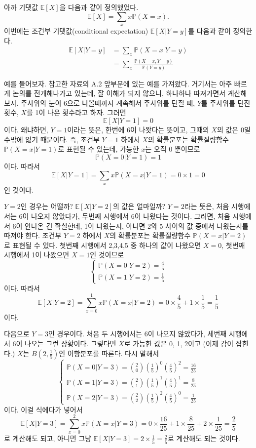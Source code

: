 \documentclass{article}
\begin{document}
아까 기댓값 \(\mathbb E[X]\)을 다음과 같이 정의했었다.
\[\mathbb E[X]=\sum_x x\mathbb P(X=x).\]
이번에는 조건부 기댓값(conditional expectation) \(\mathbb E[X|Y=y]\)를 다음과 같이 정의한다.
\begin{align*}
\mathbb E[X|Y=y]
&=\sum_x\mathbb P(X=x|Y=y)\\
&=\sum_x\frac{\mathbb P(X=x, Y=y)}{\mathbb P(Y=y)}
\end{align*}

예를 들어보자.
참고한 자료의 A.2 앞부분에 있는 예를 가져왔다.
거기서는  아주 빠르게 논의를 전개해나가고 있는데, 잘 이해가 되지 않으니, 하나하나 따져가면서 계산해보자.
주사위의 눈이 6으로 나올때까지 계속해서 주사위를 던질 때, \(Y\)를 주사위를 던진 횟수, \(X\)를 1이 나온 횟수라고 하자.
그러면
\[\mathbb E[X|Y=1]=0\]
이다.
왜냐하면, \(Y=1\)이라는 뜻은, 한번에 6이 나왓다는 뜻이고, 그때의 \(X\)의 값은 0일 수밖에 없기 때문이다.
즉, 조건부 \(Y=1\) 하에서 \(X\)의 확률분포는 확률질량함수 \(\mathbb P(X=x|Y=1)\)로 표현될 수 있는데, 가능한 \(x\)는 오직 0 뿐이므로
\[\mathbb P(X=0|Y=1)=1\]
이다.
따라서
\[\mathbb E[X|Y=1]=\sum_xx\mathbb P(X=x|Y=1)=0\times1=0\]
인 것이다.

\(Y=2\)인 경우는 어떨까?
\(\mathbb E[X|Y=2]\)의 값은 얼마일까?
\(Y=2\)라는 뜻은, 처음 시행에서는 6이 나오지 않았다가, 두번째 시행에서 6이 나왔다는 것이다.
그러면, 처음 시행에서 6이 안나온 건 확실한데, 1이 나왔는지, 아니면 2와 5 사이의 값 중에서 나왔는지를 따져야 한다.
조건부 \(Y=2\) 하에서 \(X\)의 확률분포는 확률질량함수 \(\mathbb P(X=x|Y=2)\)로 표현될 수 있다.
첫번째 시행에서 2,3,4,5 중 하나의 값이 나왔으면 \(X=0\), 첫번째 시행에서 1이 나왔으면 \(X=1\)인 것이므로
\[\begin{cases}
\mathbb P(X=0|Y=2)=\frac45\\
\mathbb P(X=1|Y=2)=\frac15
\end{cases}\]
이다.
따라서
\[\mathbb E[X|Y=2]=\sum_{x=0}^1x\mathbb P(X=x|Y=2)=0\times\frac45+1\times\frac15=\frac15\]
이다.

다음으로 \(Y=3\)인 경우이다.
처음 두 시행에서는 6이 나오지 않았다가, 세번째 시행에서 6이 나오는 그런 상황이다.
그렇다면 \(X\)로 가능한 값은 0, 1, 2이고 (이제 감이 잡힌다.) \(X\)는 \(B(2,\frac15)\)인 이항분포를 따른다.
다시 말해서
\[\begin{cases}
\mathbb P(X=0|Y=3)=\binom20\left(\frac15\right)^0\left(\frac45\right)^2=\frac{16}{25}\\
\mathbb P(X=1|Y=3)=\binom21\left(\frac15\right)^1\left(\frac45\right)^1=\frac8{25}\\
\mathbb P(X=2|Y=3)=\binom22\left(\frac15\right)^2\left(\frac45\right)^0=\frac1{25}
\end{cases}\]
이다.
이걸 식에다가 넣어서
\[\mathbb E[X|Y=3]=\sum_{x=0}^2x\mathbb P(X=x|Y=3)=0\times\frac{16}{25}+1\times\frac8{25}+2\times\frac1{25}=\frac25\]
로 계산해도 되고, 아니면 그냥 \(\mathbb E[X|Y=3]=2\times\frac15=\frac25\)로 계산해도 되는 것이다.
\end{document}
